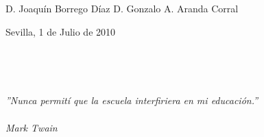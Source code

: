{D. Joaquín Borrego Díaz\newline
D. Gonzalo A. Aranda Corral\newline

Sevilla, 1 de Julio de 2010 %

\newpage
\thispagestyle{empty}
\mbox{ }
\newpage
\thispagestyle{empty}

\newpage
\thispagestyle{empty}

\mbox{ }

\vfill

\begin{flushright}
\begin{minipage}{9cm}
\em{''Nunca permití que la escuela interfiriera en mi educación.''}\\ \\
Mark Twain
\end{minipage}
\end{flushright}

\vfill

\newpage
\thispagestyle{empty}
\mbox{ }

}
